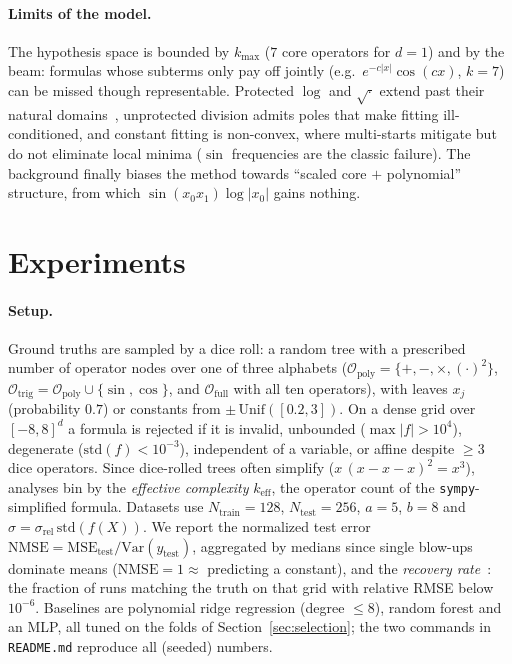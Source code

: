 \documentclass{article}
\newcommand{\eff}{k_{\mathrm{eff}}}
\newcommand{\mse}{\mathrm{MSE}}
\newcommand{\nmse}{\mathrm{NMSE}}
\begin{document}
\paragraph{Limits of the model.}
\label{sec:limits}
The hypothesis space is bounded by $k_{\max}$ ($7$ core operators for $d=1$) and
by the beam: formulas whose subterms only pay off jointly (e.g.\
$e^{-c|x|}\cos(cx)$, $k=7$) can be missed though representable. Protected $\log$
and $\sqrt{\cdot}$ extend past their natural domains~\citep{Keijzer},
unprotected division admits poles that make fitting ill-conditioned, and
constant fitting is non-convex, where multi-starts mitigate but do not eliminate
local minima ($\sin$ frequencies are the classic failure). The background
finally biases the method towards ``scaled core $+$ polynomial'' structure, from
which $\sin(x_0x_1)\log|x_0|$ gains nothing.

\section{Experiments}
\label{sec:experiments}

\paragraph{Setup.}
\label{sec:setup}
Ground truths are sampled by a dice roll: a random tree with a prescribed number
of operator nodes over one of three alphabets ($\mathcal{O}_{\mathrm{poly}} =
\{+,-,\times,(\cdot)^2\}$, $\mathcal{O}_{\mathrm{trig}} =
\mathcal{O}_{\mathrm{poly}} \cup \{\sin,\cos\}$, and $\mathcal{O}_{\mathrm{full}}$
with all ten operators), with leaves $x_j$ (probability $0.7$) or constants from
$\pm\,\mathrm{Unif}([0.2, 3])$. On a dense grid over $[-8,8]^d$ a formula is
rejected if it is invalid, unbounded ($\max|f| > 10^4$), degenerate
($\mathrm{std}(f) < 10^{-3}$), independent of a variable, or affine despite $\ge
3$ dice operators. Since dice-rolled trees often simplify ($x\,(x - x - x)^2 =
x^3$), analyses bin by the \emph{effective complexity} $\eff$, the operator
count of the \texttt{sympy}-simplified formula. Datasets use
$N_{\mathrm{train}} = 128$, $N_{\mathrm{test}} = 256$, $a = 5$, $b = 8$ and
$\sigma = \sigma_{\mathrm{rel}}\,\mathrm{std}(f(X))$. We report the normalized
test error $\nmse = \mse_{\mathrm{test}} / \mathrm{Var}(y_{\mathrm{test}})$,
aggregated by medians since single blow-ups dominate means ($\nmse = 1 \approx$
predicting a constant), and the \emph{recovery rate}~\citep{Kahlmeyer}: the
fraction of runs matching the truth on that grid with relative RMSE below
$10^{-6}$. Baselines are polynomial ridge regression (degree $\le 8$), random
forest and an MLP, all tuned on the folds of Section~\ref{sec:selection}; the
two commands in \texttt{README.md} reproduce all (seeded) numbers.
\end{document}
